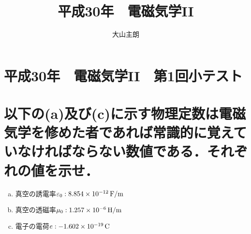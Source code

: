 \documentclass[dvipdfmx]{ujarticle}
\begin{document}
\title{平成30年　電磁気学II}
\date{}
\author{大山主朗}

\maketitle

\section*{平成30年　電磁気学II　第1回小テスト}
\section{以下の(a)及び(c)に示す物理定数は電磁気学を修めた者であれば常識的に覚えていなければならない数値である．それぞれの値を示せ．}
\begin{enumerate}[(a)]
	\item 真空の誘電率$\varepsilon_{0}:8.854 \times 10^{-12}\,\rm{F/m}$
	\item 真空の透磁率$\mu_{0}:1.257 \times 10^{-6}\,\rm{H/m}$
	\item 電子の電荷$e:-1.602 \times 10^{-19}\,\rm{C}$
\end{enumerate}
\end{document}
